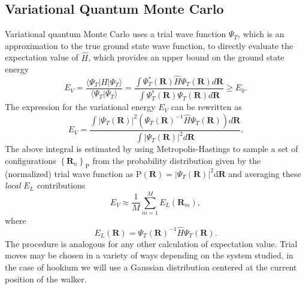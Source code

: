 \documentclass[final,3p,times,twocolumn]{elsarticle}
\begin{document}
	\subsection{Variational Quantum Monte Carlo}
	Variational quantum Monte Carlo uses a trial wave function $\Psi_{T}$, which is an approximation to the true ground state wave function, to directly evaluate the expectation value of $\hat H$, which provides an upper bound on the ground state energy
	\begin{equation}
		\label{eq:variational_princ}
		E_{V}=\frac{\langle \Psi_{T} | H | \Psi_{T} \rangle}{\langle \Psi_{T} | \Psi_{T} \rangle}
		=\frac{\int \Psi_{T}^{*}(\mathbf{R}) \hat{H} \Psi_{T}(\mathbf{R}) d \mathbf{R}}{\int \Psi_{T}^{*}(\mathbf{R}) \Psi_{T}(\mathbf{R}) d \mathbf{R}} \geq E_{0}.
	\end{equation}
	The expression for the variational energy $E_V$ can be rewritten as
	\begin{equation}
		\label{eq:E_V}
		E_{V}=\frac{\int\left|\Psi_{T}(\mathbf{R})\right|^{2}\left(\Psi_{T}(\mathbf{R})^{-1} \hat{H} \Psi_{T}(\mathbf{R})\right) d \mathbf{R}}{\int\left|\Psi_{T}(\mathbf{R})\right|^{2} d \mathbf{R}}.
	\end{equation}
	The above integral is estimated by using Metropolis-Hastings to sample a set of configurations $\left\{ \mathbf{R}_n \right\}_{\mathrm{P}}$ from the probability distribution given by the (normalized) trial wave function as $\mathrm{P}(\mathbf{R}) = |\Psi_T(\mathbf{R})|^2 \mathrm{d}\mathbf{R}$ and averaging these \emph{local} $E_L$ contributions
	\begin{equation}
		E_{V} \approx \frac{1}{M} \sum_{m=1}^{M} E_{L}\left(\mathbf{R}_{m}\right),
	\end{equation}
	where
	\begin{equation}
		E_{L}(\mathbf{R})=\Psi_{T}(\mathbf{R})^{-1} \hat{H} \Psi_{T}(\mathbf{R}).
	\end{equation}
	The procedure is analogous for any other calculation of expectation value. Trial moves may be chosen in a variety of ways depending on the system studied, in the case of hookium we will use a Gaussian distribution centered at the current position of the walker.
	
\end{document}
